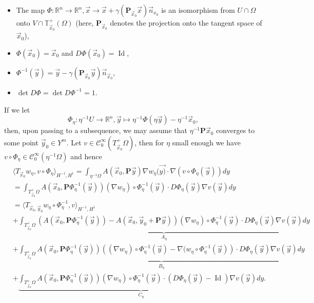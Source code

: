 \documentclass[a4paper,reqno]{amsart}
\numberwithin{equation}{section}
\numberwithin{equation}{section}		%
\numberwithin{figure}{section}			%
\numberwithin{table}{section}				%
\theoremstyle{definition}
\newcommand{\<}{\ensuremath \leq}
\renewcommand{\>}{\ensuremath \geq}
\begin{document}
\begin{itemize}
    \item The map $\Phi: \mathbb{R}^n\rightarrow\mathbb{R}^n, \vec{x}\rightarrow \vec{x} + \gamma(\textbf{P}_{\vec{x}_0}\vec{x})\vec{n}_{x_0}$ is an isomorphism from $U\cap\Omega$ onto $V\cap \mathbb{T}_{\vec{x}_0}^+(\Omega)$ (here, $\textbf{P}_{\vec{x}_0}$ denotes the projection onto the tangent space of $\vec{x}_0$),
    \item $\Phi(\vec{x}_0) = \vec{x}_0$ and $D\Phi(\vec{x}_0)=\operatorname{Id}$,
    \item $\Phi^{-1}(\vec{y}) = \vec{y} - \gamma(\textbf{P}_{\vec{x}_0}\vec{y})\vec{n}_{\vec{x}_0}$,
    \item $\det D\Phi = \det D\Phi^{-1} = 1$.
\end{itemize}
If we let
\begin{equation}\Phi_\eta:\eta^{-1}U\rightarrow\mathbb{R}^n,\vec{y}\mapsto\eta^{-1}\Phi(\eta\vec{y}) - \eta^{-1}\vec{x}_0,
\end{equation}
then, upon passing to a subsequence, we may assume that $\eta^{-1}\textbf{P}\vec{x}_0$ converges to some point $\vec{y}_0\in Y^m$. Let $v\in\mathcal{C}^\infty_0(T_{\vec{x}_0}^+\Omega)$, then for $\eta$ small enough we have $v\circ\Phi_\eta\in\mathcal{C}_0^\infty(\eta^{-1}\Omega)$ and hence
\begin{align}%
        &\langle T_{\vec{x}_0}w_\eta, v\circ\Phi_\eta\rangle_{H^{-1},H^1} = \int_{\eta^{-1}\Omega}A\left(\vec{x}_0, \textbf{P}\vec{y}\right)\nabla w_\eta(\vec{y)}\cdot\nabla(v\circ\Phi_\eta(\vec{y}))dy\nonumber\\
        &=\int_{T_{\vec{x}_0}^+\Omega}A\left(\vec{x}_0, \textbf{P}\Phi^{-1}_\eta(\vec{y})\right)(\nabla w_\eta)\circ\Phi^{-1}_\eta(\vec{y})\cdot D\Phi_\eta(\vec{y})\nabla v(\vec{y})dy \nonumber\\
        &=\langle T_{\vec{x}_0,\vec{y}_0}w_\eta\circ\Phi_\eta^{-1},v\rangle_{H^{-1},H^1}\nonumber\\
        &+ \underbrace{\int_{T_{\vec{x}_0}^+\Omega}\left(A\left(\vec{x}_0, \textbf{P}\Phi^{-1}_\eta(\vec{y})\right) - A\left(\vec{x}_0, \vec{y}_0+\textbf{P}\vec{y}\right)\right)(\nabla w_\eta)\circ\Phi^{-1}_\eta(\vec{y})\cdot D\Phi_\eta(\vec{y})\nabla v(\vec{y})dy}_{A_\eta}\nonumber\\
        &+\underbrace{\int_{T_{\vec{x}_0}^+\Omega}A\left(\vec{x}_0, \textbf{P}\Phi^{-1}_\eta(\vec{y})\right)\left((\nabla w_\eta)\circ\Phi^{-1}_\eta(\vec{y}) - \nabla(w_\eta\circ\Phi_\eta^{-1}(\vec{y})\right)\cdot D\Phi_\eta(\vec{y})\nabla v(\vec{y})dy}_{B_\eta}\nonumber\\
        &+\underbrace{\int_{T_{\vec{x}_0}^+\Omega}A\left(\vec{x}_0, \textbf{P}\Phi^{-1}_\eta(\vec{y})\right)(\nabla w_\eta)\circ\Phi^{-1}_\eta(\vec{y})\cdot (D\Phi_\eta(\vec{y}) - \operatorname{Id})\nabla v(\vec{y})dy}_{C_\eta}. \label{eq:Boundary1}
\end{align}
\end{document}
